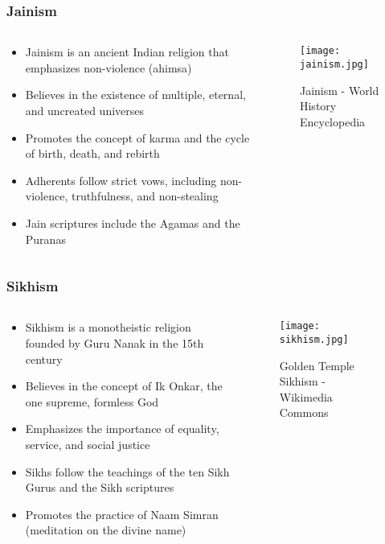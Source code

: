 \begin{frame}[fragile]\frametitle{Jainism}
\begin{columns}
\begin{column}{0.5\textwidth}
\begin{itemize}
    \item Jainism is an ancient Indian religion that emphasizes non-violence (ahimsa)
    \item Believes in the existence of multiple, eternal, and uncreated universes
    \item Promotes the concept of karma and the cycle of birth, death, and rebirth
    \item Adherents follow strict vows, including non-violence, truthfulness, and non-stealing
    \item Jain scriptures include the Agamas and the Puranas
\end{itemize}
\end{column}
\begin{column}{0.5\textwidth}
\begin{figure}
    \texttt{[image: jainism.jpg]}
    \caption{Jainism - World History Encyclopedia}
\end{figure}
\end{column}
\end{columns}
\end{frame}

\begin{frame}[fragile]\frametitle{Sikhism}
\begin{columns}
\begin{column}{0.5\textwidth}
\begin{itemize}
    \item Sikhism is a monotheistic religion founded by Guru Nanak in the 15th century
    \item Believes in the concept of Ik Onkar, the one supreme, formless God
    \item Emphasizes the importance of equality, service, and social justice
    \item Sikhs follow the teachings of the ten Sikh Gurus and the Sikh scriptures
    \item Promotes the practice of Naam Simran (meditation on the divine name)
\end{itemize}
\end{column}
\begin{column}{0.5\textwidth}
\begin{figure}
    \texttt{[image: sikhism.jpg]}
    \caption{Golden Temple Sikhism - Wikimedia Commons}
\end{figure}
\end{column}
\end{columns}
\end{frame}